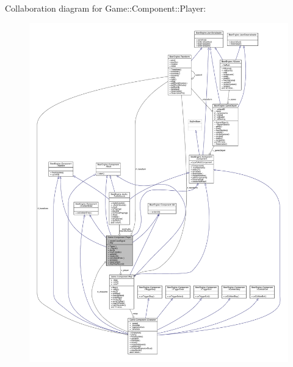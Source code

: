 Collaboration diagram for Game\+:\+:Component\+:\+:Player\+:\nopagebreak
\begin{figure}[H]
\begin{center}
\leavevmode
\includegraphics[width=350pt]{class_game_1_1_component_1_1_player__coll__graph}
\end{center}
\end{figure}
